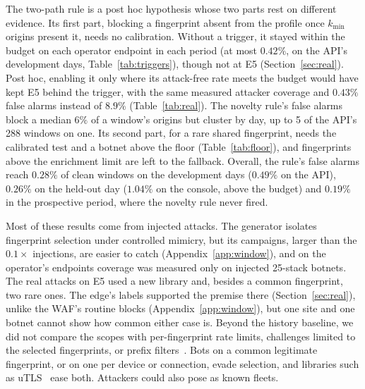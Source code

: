 \documentclass[conference,letterpaper,10pt]{IEEEtran}
\newcommand\1{\textit{(i)}}
\newcommand\2{\textit{(ii)}}
\newcommand\3{\textit{(iii)}}
\newcommand\4{\textit{(iv)}}
\newcommand\5{\textit{(v)}}
\newcommand\6{\textit{(vi)}}
\newcommand\7{\textit{(vii)}}
\newcommand\8{\textit{(viii)}}
\newcommand\9{\textit{(ix)}}
\begin{document}
The two-path rule is a post hoc hypothesis whose two parts rest on different evidence. Its first part, blocking a fingerprint absent from the profile once $k_{\min}$ origins present it, needs no calibration. Without a trigger, it stayed within the budget on each operator endpoint in each period (at most $0.42\%$, on the API's development days, Table~\ref{tab:triggers}), though not at E5 (Section~\ref{sec:real}). Post hoc, enabling it only where its attack-free rate meets the budget would have kept E5 behind the trigger, with the same measured attacker coverage and $0.43\%$ false alarms instead of $8.9\%$ (Table~\ref{tab:real}). The novelty rule's false alarms block a median $6\%$ of a window's origins but cluster by day, up to 5 of the API's 288 windows on one. Its second part, for a rare shared fingerprint, needs the calibrated test and a botnet above the floor (Table~\ref{tab:floor}), and fingerprints above the enrichment limit are left to the fallback. Overall, the rule's false alarms reach $0.28\%$ of clean windows on the development days ($0.49\%$ on the API), $0.26\%$ on the held-out day ($1.04\%$ on the console, above the budget) and $0.19\%$ in the prospective period, where the novelty rule never fired.    

Most of these results come from injected attacks. The generator isolates fingerprint selection under controlled mimicry, but its campaigns, larger than the $0.1\times$ injections, are easier to catch (Appendix~\ref{app:window}), and on the operator's endpoints coverage was measured only on injected 25-stack botnets. The real attacks on E5 used a new library and, besides a common fingerprint, two rare ones. The edge's labels supported the premise there (Section~\ref{sec:real}), unlike the WAF's routine blocks (Appendix~\ref{app:window}), but one site and one botnet cannot show how common either case is. Beyond the history baseline, we did not compare the scopes with per-fingerprint rate limits, challenges limited to the selected fingerprints, or prefix filters~\cite{soldo2012filtering}. Bots on a common legitimate fingerprint, or on one per device or connection, evade selection, and libraries such as uTLS~\cite{frolov2019tls} ease both. Attackers could also pose as known fleets. 
\end{document}
